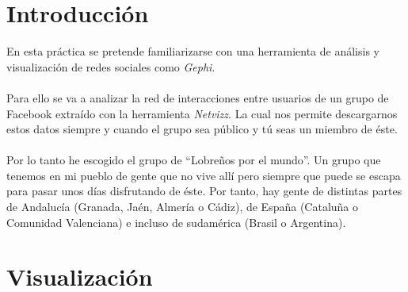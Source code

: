	
	
	
\setcounter{page}{0}

\maketitle %
\thispagestyle{empty}

\newpage %

\tableofcontents %

\newpage %

\listoffigures

\listoftables

\newpage


\section{Introducción}
\label{sec:intro}

En esta práctica se pretende familiarizarse con una herramienta de análisis y visualización de redes sociales como \textit{Gephi}.
\\ \\
Para ello se va a analizar la red de interacciones entre usuarios de un grupo de Facebook extraído con la herramienta \textit{Netvizz}. La cual nos permite descargarnos estos datos siempre y cuando el grupo sea público y tú seas un miembro de éste.
\\ \\
Por lo tanto he escogido el grupo de ``Lobreños por el mundo''. Un grupo que tenemos en mi pueblo de gente que no vive allí pero siempre que puede se escapa para pasar unos días disfrutando de éste. Por tanto, hay gente de distintas partes de Andalucía (Granada, Jaén, Almería o Cádiz), de España (Cataluña o Comunidad Valenciana) e incluso de sudamérica (Brasil o Argentina).

\section{Visualización}

